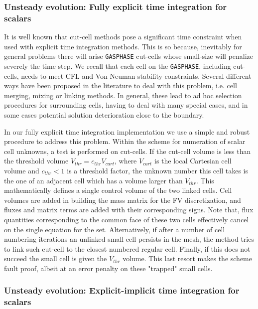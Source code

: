 \documentclass[12pt]{article}
\begin{document}
\subsubsection{Unsteady evolution: Fully explicit time integration for scalars} \label{sec:exscl}

It is well known that cut-cell methods pose a significant time constraint when used with explicit time integration methods. 
This is so because, inevitably for general problems there will arise \texttt{GASPHASE} cut-cells whose small-size will penalize 
severely the time step. We recall that each cell on the \texttt{GASPHASE}, including cut-cells, needs to meet CFL and Von Neuman stability constraints. Several different ways have been proposed in the literature to deal with this problem, i.e. cell merging, mixing or linking methods. In general, these lead to ad hoc selection procedures for surrounding cells, having to deal with many special cases, and in some cases potential solution deterioration close to the boundary.

In our fully explicit time integration implementation we use a simple and robust procedure to address this problem. Within the scheme for numeration of scalar cell unknowns, a test is performed on cut-cells. If the cut-cell volume is less than the threshold volume $V_{thr}= c_{thr} V_{cart}$, where $V_{cart}$ is the local Cartesian cell volume and $c_{thr}<1$ is a threshold factor, the unknown number this cell takes is the one of an adjacent cell which has a volume larger than $V_{thr}$. This mathematically defines a single control volume of the two linked cells. Cell volumes are added in building the mass matrix for the FV discretization, and fluxes and matrix terms are added with their corresponding signs. Note that, flux quantities corresponding to the common face of these two cells effectively cancel on the single equation for the set.
Alternatively, if after a number of cell numbering iterations an unlinked small cell persists in the mesh, the method tries to link such cut-cell to the closest numbered regular cell. Finally, if this does not succeed the small cell is given the $V_{thr}$ volume. This last resort makes the scheme fault proof, albeit at an error penalty on these "trapped" small cells.  



\subsubsection{Unsteady evolution: Explicit-implicit time integration for scalars} \label{sec:eximscl}
\end{document}
